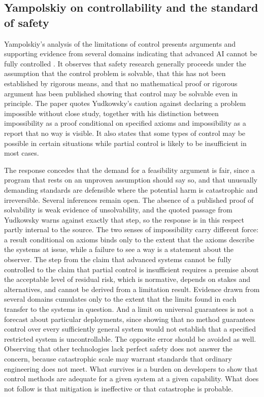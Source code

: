 \documentclass[11pt]{article}
\begin{document}
\subsection{Yampolskiy on controllability and the standard of safety}

Yampolskiy's analysis of the limitations of control presents arguments and supporting evidence from several domains indicating that advanced AI cannot be fully controlled \citep{yampolskiy2022}. It observes that safety research generally proceeds under the assumption that the control problem is solvable, that this has not been established by rigorous means, and that no mathematical proof or rigorous argument has been published showing that control may be solvable even in principle. The paper quotes Yudkowsky's caution against declaring a problem impossible without close study, together with his distinction between impossibility as a proof conditional on specified axioms and impossibility as a report that no way is visible. It also states that some types of control may be possible in certain situations while partial control is likely to be insufficient in most cases.

The response concedes that the demand for a feasibility argument is fair, since a program that rests on an unproven assumption should say so, and that unusually demanding standards are defensible where the potential harm is catastrophic and irreversible. Several inferences remain open. The absence of a published proof of solvability is weak evidence of unsolvability, and the quoted passage from Yudkowsky warns against exactly that step, so the response is in this respect partly internal to the source. The two senses of impossibility carry different force: a result conditional on axioms binds only to the extent that the axioms describe the systems at issue, while a failure to see a way is a statement about the observer. The step from the claim that advanced systems cannot be fully controlled to the claim that partial control is insufficient requires a premise about the acceptable level of residual risk, which is normative, depends on stakes and alternatives, and cannot be derived from a limitation result. Evidence drawn from several domains cumulates only to the extent that the limits found in each transfer to the systems in question. And a limit on universal guarantees is not a forecast about particular deployments, since showing that no method guarantees control over every sufficiently general system would not establish that a specified restricted system is uncontrollable. The opposite error should be avoided as well. Observing that other technologies lack perfect safety does not answer the concern, because catastrophic scale may warrant standards that ordinary engineering does not meet. What survives is a burden on developers to show that control methods are adequate for a given system at a given capability. What does not follow is that mitigation is ineffective or that catastrophe is probable.
\end{document}
